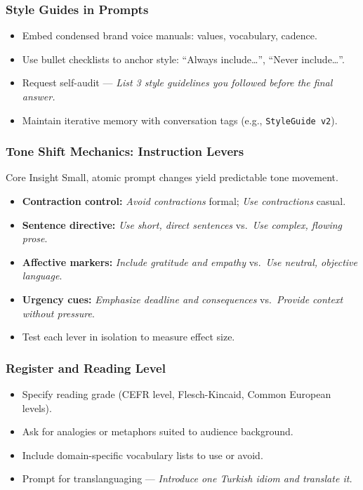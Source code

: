 \documentclass{beamer}
\begin{document}
\begin{frame}
    \frametitle{Style Guides in Prompts}
    \begin{itemize}
        \item Embed condensed brand voice manuals: values, vocabulary, cadence.
        \item Use bullet checklists to anchor style: ``Always include\ldots'', ``Never include\ldots''.
    \item Request self-audit — \emph{List 3 style guidelines you followed before the final answer.} 
        \item Maintain iterative memory with conversation tags (e.g., \texttt{StyleGuide v2}).
    \end{itemize}
\end{frame}

\begin{frame}
    \frametitle{Tone Shift Mechanics: Instruction Levers}
    \begin{block}{Core Insight}
        Small, atomic prompt changes yield predictable tone movement.
    \end{block}
    \begin{itemize}
        \item \textbf{Contraction control:} \emph{Avoid contractions} \textrightarrow{} formal; \emph{Use contractions} \textrightarrow{} casual.
        \item \textbf{Sentence directive:} \emph{Use short, direct sentences} vs.\ \emph{Use complex, flowing prose}.
        \item \textbf{Affective markers:} \emph{Include gratitude and empathy} vs.\ \emph{Use neutral, objective language}.
        \item \textbf{Urgency cues:} \emph{Emphasize deadline and consequences} vs.\ \emph{Provide context without pressure}.
        \item Test each lever in isolation to measure effect size.
    \end{itemize}
\end{frame}

\begin{frame}
    \frametitle{Register and Reading Level}
    \begin{itemize}
        \item Specify reading grade (CEFR level, Flesch-Kincaid, Common European levels).
        \item Ask for analogies or metaphors suited to audience background.
        \item Include domain-specific vocabulary lists to use or avoid.
    \item Prompt for translanguaging — \emph{Introduce one Turkish idiom and translate it.} 
    \end{itemize}
\end{frame}
\end{document}
